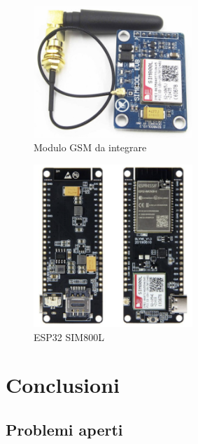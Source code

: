 \documentclass[12pt, a4paper, italian]{report}
\numberwithin{figure}{chapter}
\numberwithin{table}{chapter}
\begin{document}
\begin{figure}[h]
  \centering
  \includegraphics[width=6cm]{gsm_module.png}
  \caption{Modulo GSM da integrare}
  \label{fig:modulo_gsm}
\end{figure}

\begin{figure}[h]
  \centering
  \includegraphics[width=6cm]{esp32_gsm.png}
  \caption{ESP32 SIM800L}
  \label{fig:esp32_gsm}
\end{figure}

\chapter{Conclusioni}
\section{Problemi aperti}
\end{document}
